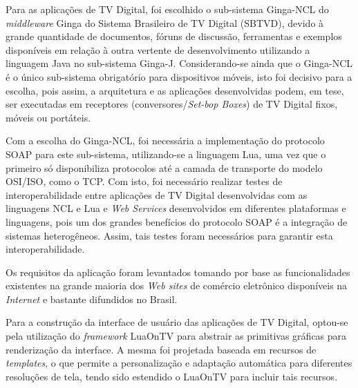Para as aplicações de TV Digital, foi escolhido o sub-sistema Ginga-NCL do \textit{middleware} Ginga
do Sistema Brasileiro de TV Digital (SBTVD),
devido à grande quantidade de documentos, fóruns de discussão, ferramentas e exemplos disponíveis
em relação à outra vertente de desenvolvimento utilizando a linguagem Java no sub-sistema Ginga-J.
Considerando-se ainda que o Ginga-NCL é o único sub-sistema obrigatório para dispositivos móveis,
isto foi decisivo para a escolha, pois assim, a arquitetura e as aplicações desenvolvidas
podem, em tese, ser executadas em receptores (conversores/\textit{Set-bop Boxes}) de TV Digital fixos, móveis ou portáteis.

Com a escolha do Ginga-NCL, foi necessária a implementação do protocolo SOAP para este sub-sistema,
utilizando-se a linguagem Lua, uma vez que o primeiro só disponibiliza protocolos até a camada de transporte
do modelo OSI/ISO, como o TCP. Com isto, foi necessário realizar testes de interoperabilidade
entre aplicações de TV Digital desenvolvidas com as linguagens NCL e Lua e \textit{Web Services}
desenvolvidos em diferentes plataformas e linguagens, pois um dos grandes benefícios
do protocolo SOAP é a integração de sistemas heterogêneos. Assim, tais testes foram
necessários para garantir esta interoperabilidade.

Os requisitos da aplicação foram levantados tomando por base as funcionalidades
existentes na grande maioria dos \textit{Web sites} de comércio eletrônico
disponíveis na \textit{Internet} e bastante difundidos no Brasil.

Para a construção da interface de usuário das aplicações de TV Digital, optou-se pela utilização
do \textit{framework} LuaOnTV para abstrair as primitivas gráficas para renderização da interface.
A mesma foi projetada baseada em recursos de \textit{templates}, o que permite a personalização
e adaptação automática para diferentes resoluções de tela, tendo sido estendido
o LuaOnTV para incluir tais recursos.


